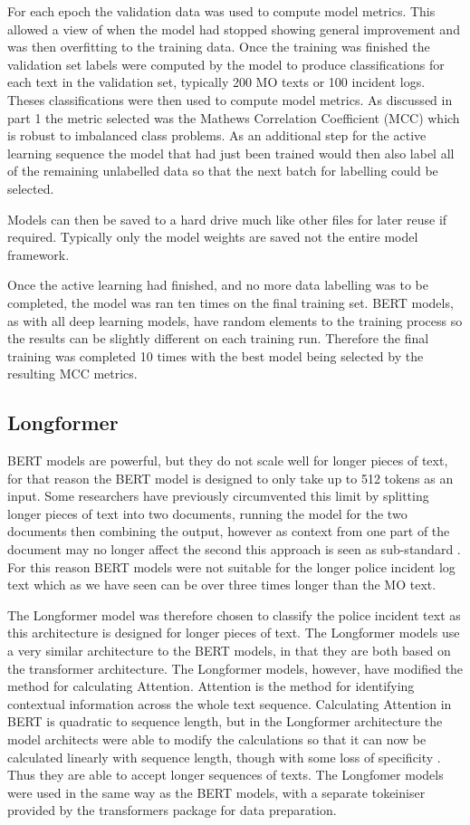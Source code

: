 For each epoch the validation data was used to compute model metrics. This allowed a view of when the model had stopped showing general improvement and was then overfitting to the training data. Once the training was finished the validation set labels were computed by the model to produce classifications for each text in the validation set, typically 200 MO texts or 100 incident logs. Theses classifications were then used to compute model metrics. As discussed in part 1 the metric selected was the Mathews Correlation Coefficient (MCC) which is robust to imbalanced class problems. As an additional step for the active learning sequence the model that had just been trained would then also label all of the remaining unlabelled data so that the next batch for labelling could be selected.

Models can then be saved to a hard drive much like other files for later reuse if required. Typically only the model weights are saved not the entire model framework. 

Once the active learning had finished, and no more data labelling was to be completed, the model was ran ten times on the final training set. BERT models, as with all deep learning models, have random elements to the training process so the results can be slightly different on each training run. Therefore the final training was completed 10 times with the best model being selected by the resulting MCC metrics. 

\subsection{Longformer} BERT models are powerful, but they do not scale well for longer pieces of text, for that reason the BERT model is designed to only take up to 512 tokens as an input. Some researchers have previously circumvented this limit by splitting longer pieces of text into two documents, running the model for the two documents then combining the output, however as context from one part of the document may no longer affect the second this approach is seen as sub-standard \parencite{Longformer}. For this reason BERT models were not suitable for the longer police incident log text which as we have seen can be over three times longer than the MO text. 

The Longformer model \parencite{Longformer} was therefore chosen to classify the police incident text as this architecture is designed for longer pieces of text. The Longformer models use a very similar architecture to the BERT models, in that they are both based on the transformer architecture. The Longformer models, however, have modified the method for calculating Attention. Attention is the method for identifying contextual information across the whole text sequence. Calculating Attention in BERT is quadratic to sequence length, but in the Longformer architecture the model architects were able to modify the calculations so that it can now be calculated linearly with sequence length, though with some loss of specificity \parencite{Longformer}. Thus they are able to accept longer sequences of texts. The Longfomer models were used in the same way as the BERT models, with a separate tokeiniser provided by the transformers package for data preparation.

